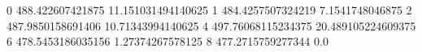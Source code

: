 0 488.422607421875 11.151031494140625
1 484.4257507324219 7.1541748046875
2 487.9850158691406 10.71343994140625
4 497.76068115234375 20.489105224609375
6 478.5453186035156 1.27374267578125
8 477.2715759277344 0.0
